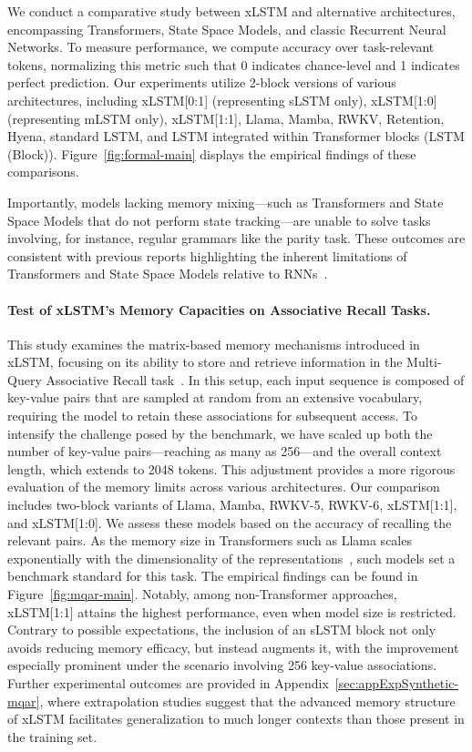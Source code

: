 We conduct a comparative study between xLSTM and alternative architectures, encompassing Transformers, State Space Models, and classic Recurrent Neural Networks. To measure performance, we compute accuracy over task-relevant tokens, normalizing this metric such that 0 indicates chance-level and 1 indicates perfect prediction. Our experiments utilize 2-block versions of various architectures, including xLSTM[0:1] (representing sLSTM only), xLSTM[1:0] (representing mLSTM only), xLSTM[1:1], Llama, Mamba, RWKV, Retention, Hyena, standard LSTM, and LSTM integrated within Transformer blocks (LSTM (Block)). Figure~\ref{fig:formal-main} displays the empirical findings of these comparisons.

Importantly, models lacking memory mixing—such as Transformers and State Space Models that do not perform state tracking—are unable to solve tasks involving, for instance, regular grammars like the parity task. These outcomes are consistent with previous reports highlighting the inherent limitations of Transformers and State Space Models relative to RNNs~\citep{Merrill:24, Merrill:23, Deletang:23}.

\paragraph{Test of xLSTM's Memory Capacities on Associative Recall Tasks.} This study examines the matrix-based memory mechanisms introduced in xLSTM, focusing on its ability to store and retrieve information in the Multi-Query Associative Recall task~\citep{Arora:23arxiv}. In this setup, each input sequence is composed of key-value pairs that are sampled at random from an extensive vocabulary, requiring the model to retain these associations for subsequent access. To intensify the challenge posed by the benchmark, we have scaled up both the number of key-value pairs—reaching as many as 256—and the overall context length, which extends to 2048 tokens. This adjustment provides a more rigorous evaluation of the memory limits across various architectures. Our comparison includes two-block variants of Llama, Mamba, RWKV-5, RWKV-6, xLSTM[1:1], and xLSTM[1:0]. We assess these models based on the accuracy of recalling the relevant pairs. As the memory size in Transformers such as Llama scales exponentially with the dimensionality of the representations~\citep{Ramsauer:21}, such models set a benchmark standard for this task. The empirical findings can be found in Figure~\ref{fig:mqar-main}. Notably, among non-Transformer approaches, xLSTM[1:1] attains the highest performance, even when model size is restricted. Contrary to possible expectations, the inclusion of an sLSTM block not only avoids reducing memory efficacy, but instead augments it, with the improvement especially prominent under the scenario involving 256 key-value associations. Further experimental outcomes are provided in Appendix~\ref{sec:appExpSynthetic-mqar}, where extrapolation studies suggest that the advanced memory structure of xLSTM facilitates generalization to much longer contexts than those present in the training set.

